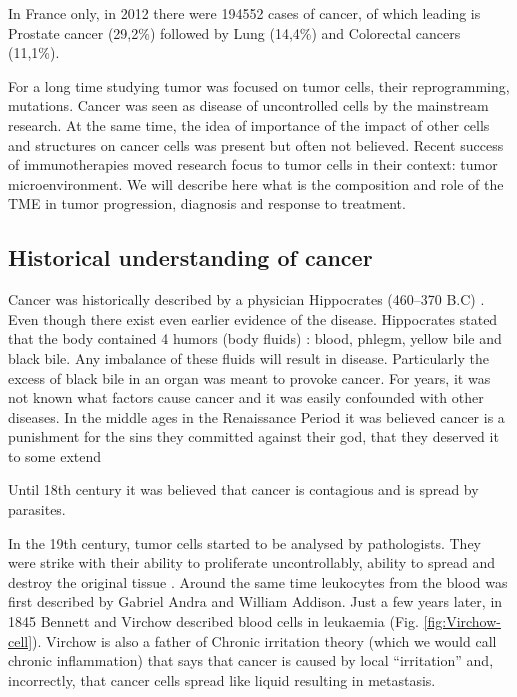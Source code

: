 \documentclass[12pt,]{book}
\theoremstyle{definition}
\theoremstyle{definition}
\theoremstyle{definition}
\theoremstyle{remark}
\begin{document}
In France only, in 2012 there were 194552 cases of cancer, of which
leading is Prostate cancer (29,2\%) followed by Lung (14,4\%) and
Colorectal cancers (11,1\%).

For a long time studying tumor was focused on tumor cells, their
reprogramming, mutations. Cancer was seen as disease of uncontrolled
cells by the mainstream research. At the same time, the idea of
importance of the impact of other cells and structures on cancer cells
was present but often not believed. Recent success of immunotherapies
moved research focus to tumor cells in their context: tumor
microenvironment. We will describe here what is the composition and role
of the TME in tumor progression, diagnosis and response to treatment.

\hypertarget{hist}{%
\subsection{Historical understanding of cancer}\label{hist}}

Cancer was historically described by a physician Hippocrates (460--370
B.C) \citep{Sudhakar2009}. Even though there exist even earlier evidence
of the disease. Hippocrates stated that the body contained 4 humors
(body fluids) : blood, phlegm, yellow bile and black bile. Any imbalance
of these fluids will result in disease. Particularly the excess of black
bile in an organ was meant to provoke cancer. For years, it was not
known what factors cause cancer and it was easily confounded with other
diseases. In the middle ages in the Renaissance Period it was believed
cancer is a punishment for the sins they committed against their god,
that they deserved it to some extend

Until 18th century it was believed that cancer is contagious and is
spread by parasites.

In the 19th century, tumor cells started to be analysed by pathologists.
They were strike with their ability to proliferate uncontrollably,
ability to spread and destroy the original tissue \citep{NPR2010}.
Around the same time leukocytes from the blood was first described by
Gabriel Andra and William Addison. Just a few years later, in 1845
Bennett and Virchow described blood cells in leukaemia (Fig.
\ref{fig:Virchow-cell}). Virchow is also a father of Chronic irritation
theory (which we would call chronic inflammation) that says that cancer
is caused by local ``irritation'' and, incorrectly, that cancer cells
spread like liquid resulting in metastasis.
\end{document}
